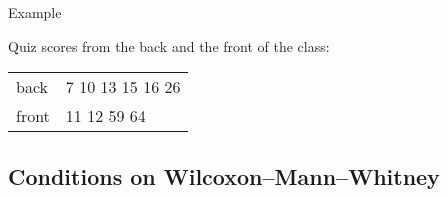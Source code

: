 \begin{frame}{Example}

  Quiz scores from the back and the front of the class:

  \begin{center}
    \begin{tabular}{l|p{1.5in}}
      \hline
      back & 7 \hspace{.25em} 10 \hspace{.25em} 13 \hspace{.25em} 15 \hspace{.25em} 16 \hspace{.25em} 26 \\
      front & \hspace{.25em} 11 \hspace{.25em} 12 \hspace{.25em} 59 \hspace{.25em} 64 \\
      \hline
    \end{tabular}
  \end{center}

    \vspace{2em}


\end{frame}

\subsection{Conditions on Wilcoxon--Mann--Whitney}

